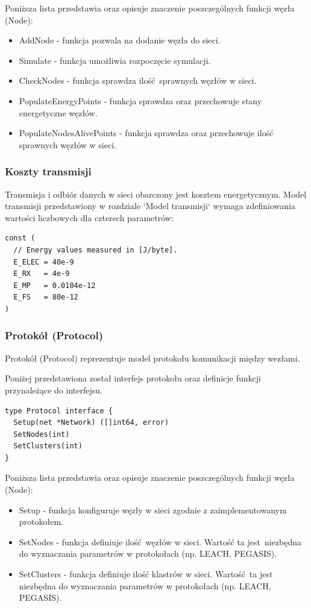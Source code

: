 \documentclass[a4paper,12pt,twoside,openany]{report}
\begin{document}
Poniższa lista przedstawia oraz opisuje znaczenie poszczególnych funkcji węzła (Node):

\begin{itemize}
 \item AddNode - funkcja pozwala na dodanie węzła do sieci.
 \item Simulate - funkcja umożliwia rozpoczęcie symulacji.
 \item CheckNodes - funkcja sprawdza ilość sprawnych węzłów w sieci.
 \item PopulateEnergyPoints - funkcja sprawdza oraz przechowuje stany energetyczne węzłów.
 \item PopulateNodesAlivePoints - funkcja sprawdza oraz przechowuje ilość sprawnych węzłów w sieci.
\end{itemize}

\subsubsection{Koszty transmisji}

Transmisja i odbiór danych w sieci obarczony jest kosztem energetycznym.
Model transmisji przedstawiony w rozdziale `Model transmisji` wymaga zdefiniowania wartości liczbowych dla czterech parametrów:

\begin{lstlisting}
const (
  // Energy values measured in [J/byte].
  E_ELEC = 40e-9
  E_RX   = 4e-9
  E_MP   = 0.0104e-12
  E_FS   = 80e-12
)
\end{lstlisting}

\subsubsection{Protokół (Protocol)}

Protokół (Protocol) reprezentuje model protokołu komunikacji między wezłami.

Poniżej przedstawiona został interfejs protokołu oraz definicje funkcji przynależące do interfejsu.

\begin{lstlisting}
type Protocol interface {
  Setup(net *Network) ([]int64, error)
  SetNodes(int)
  SetClusters(int)
}
\end{lstlisting}

Poniższa lista przedstawia oraz opisuje znaczenie poszczególnych funkcji węzła (Node):

\begin{itemize}
 \item Setup - funkcja konfiguruje węzły w sieci zgodnie z zaimplementowanym protokołem.
 \item SetNodes - funkcja definiuje ilość węzłów w sieci. Wartość ta jest niezbędna do wyznaczania parametrów w protokołach (np. LEACH, PEGASIS).
 \item SetClusters - funkcja definiuje ilość klastrów w sieci. Wartość ta jest niezbędna do wyznaczania parametrów w protokołach (np. LEACH, PEGASIS).
\end{itemize}
\end{document}

